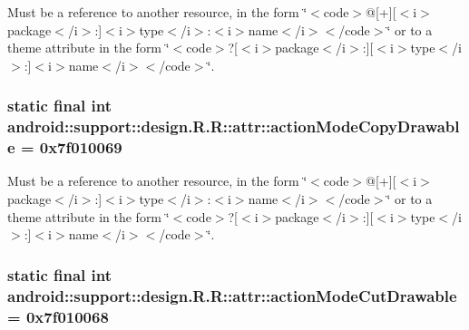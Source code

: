 Must be a reference to another resource, in the form \char`\"{}$<$code$>$@\mbox{[}+\mbox{]}\mbox{[}$<$i$>$package$<$/i$>$:\mbox{]}$<$i$>$type$<$/i$>$:$<$i$>$name$<$/i$>$$<$/code$>$\char`\"{} or to a theme attribute in the form \char`\"{}$<$code$>$?\mbox{[}$<$i$>$package$<$/i$>$:\mbox{]}\mbox{[}$<$i$>$type$<$/i$>$:\mbox{]}$<$i$>$name$<$/i$>$$<$/code$>$\char`\"{}. \hypertarget{classandroid_1_1support_1_1design_1_1_r_1_1attr_1f2967bd633597a3425094e72decb4ac}{
\subsubsection[{actionModeCopyDrawable}]{\setlength{\rightskip}{0pt plus 5cm}static final int android::support::design.R.R::attr::actionModeCopyDrawable = 0x7f010069}}
\label{classandroid_1_1support_1_1design_1_1_r_1_1attr_1f2967bd633597a3425094e72decb4ac}


Must be a reference to another resource, in the form \char`\"{}$<$code$>$@\mbox{[}+\mbox{]}\mbox{[}$<$i$>$package$<$/i$>$:\mbox{]}$<$i$>$type$<$/i$>$:$<$i$>$name$<$/i$>$$<$/code$>$\char`\"{} or to a theme attribute in the form \char`\"{}$<$code$>$?\mbox{[}$<$i$>$package$<$/i$>$:\mbox{]}\mbox{[}$<$i$>$type$<$/i$>$:\mbox{]}$<$i$>$name$<$/i$>$$<$/code$>$\char`\"{}. \hypertarget{classandroid_1_1support_1_1design_1_1_r_1_1attr_fa8cb94c68a34cae9f87e2f6a51c4c41}{
\subsubsection[{actionModeCutDrawable}]{\setlength{\rightskip}{0pt plus 5cm}static final int android::support::design.R.R::attr::actionModeCutDrawable = 0x7f010068}}
\label{classandroid_1_1support_1_1design_1_1_r_1_1attr_fa8cb94c68a34cae9f87e2f6a51c4c41}


